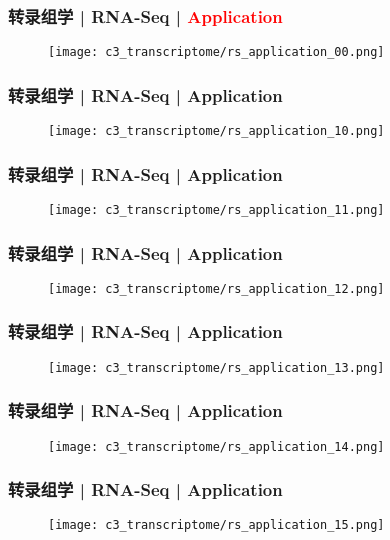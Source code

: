 \begin{frame}
  \frametitle{转录组学 | RNA-Seq | \textcolor{red}{Application}}
  \begin{figure}
    \centering
    \texttt{[image: c3\_transcriptome/rs\_application\_00.png]}
  \end{figure}
\end{frame}

\begin{frame}
  \frametitle{转录组学 | RNA-Seq | Application}
  \begin{figure}
    \centering
    \texttt{[image: c3\_transcriptome/rs\_application\_10.png]}
  \end{figure}
\end{frame}

\begin{frame}
  \frametitle{转录组学 | RNA-Seq | Application}
  \begin{figure}
    \centering
    \texttt{[image: c3\_transcriptome/rs\_application\_11.png]}
  \end{figure}
\end{frame}

\begin{frame}
  \frametitle{转录组学 | RNA-Seq | Application}
  \begin{figure}
    \centering
    \texttt{[image: c3\_transcriptome/rs\_application\_12.png]}
  \end{figure}
\end{frame}

\begin{frame}
  \frametitle{转录组学 | RNA-Seq | Application}
  \begin{figure}
    \centering
    \texttt{[image: c3\_transcriptome/rs\_application\_13.png]}
  \end{figure}
\end{frame}

\begin{frame}
  \frametitle{转录组学 | RNA-Seq | Application}
  \begin{figure}
    \centering
    \texttt{[image: c3\_transcriptome/rs\_application\_14.png]}
  \end{figure}
\end{frame}

\begin{frame}
  \frametitle{转录组学 | RNA-Seq | Application}
  \begin{figure}
    \centering
    \texttt{[image: c3\_transcriptome/rs\_application\_15.png]}
  \end{figure}
\end{frame}

